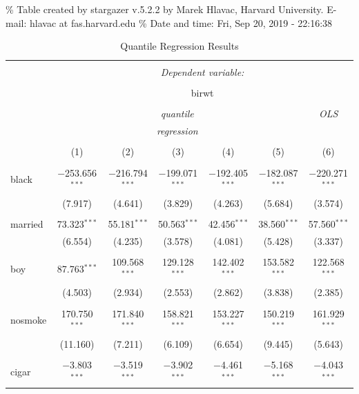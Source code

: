 \documentclass[]{book}
\begin{document}
\% Table created by stargazer v.5.2.2 by Marek Hlavac, Harvard
University. E-mail: hlavac at fas.harvard.edu \% Date and time: Fri, Sep
20, 2019 - 22:16:38

\begin{table}[!htbp] \centering 
  \caption{Quantile Regression Results} 
  \label{tab:} 
\begin{tabular}{@{\extracolsep{5pt}}lcccccc} 
\\[-1.8ex]\hline 
\hline \\[-1.8ex] 
 & \multicolumn{6}{c}{\textit{Dependent variable:}} \\ 
\cline{2-7} 
\\[-1.8ex] & \multicolumn{6}{c}{birwt} \\ 
\\[-1.8ex] & \multicolumn{5}{c}{\textit{quantile}} & \textit{OLS} \\ 
 & \multicolumn{5}{c}{\textit{regression}} & \textit{} \\ 
\\[-1.8ex] & (1) & (2) & (3) & (4) & (5) & (6)\\ 
\hline \\[-1.8ex] 
 black & $-$253.656$^{***}$ & $-$216.794$^{***}$ & $-$199.071$^{***}$ & $-$192.405$^{***}$ & $-$182.087$^{***}$ & $-$220.271$^{***}$ \\ 
  & (7.917) & (4.641) & (3.829) & (4.263) & (5.684) & (3.574) \\ 
  & & & & & & \\ 
 married & 73.323$^{***}$ & 55.181$^{***}$ & 50.563$^{***}$ & 42.456$^{***}$ & 38.560$^{***}$ & 57.560$^{***}$ \\ 
  & (6.554) & (4.235) & (3.578) & (4.081) & (5.428) & (3.337) \\ 
  & & & & & & \\ 
 boy & 87.763$^{***}$ & 109.568$^{***}$ & 129.128$^{***}$ & 142.402$^{***}$ & 153.582$^{***}$ & 122.568$^{***}$ \\ 
  & (4.503) & (2.934) & (2.553) & (2.862) & (3.838) & (2.385) \\ 
  & & & & & & \\ 
 nosmoke & 170.750$^{***}$ & 171.840$^{***}$ & 158.821$^{***}$ & 153.227$^{***}$ & 150.219$^{***}$ & 161.929$^{***}$ \\ 
  & (11.160) & (7.211) & (6.109) & (6.654) & (9.445) & (5.643) \\ 
  & & & & & & \\ 
 cigar & $-$3.803$^{***}$ & $-$3.519$^{***}$ & $-$3.902$^{***}$ & $-$4.461$^{***}$ & $-$5.168$^{***}$ & $-$4.043$^{***}$ \\ 

\end{tabular}
\end{table}
\end{document}
